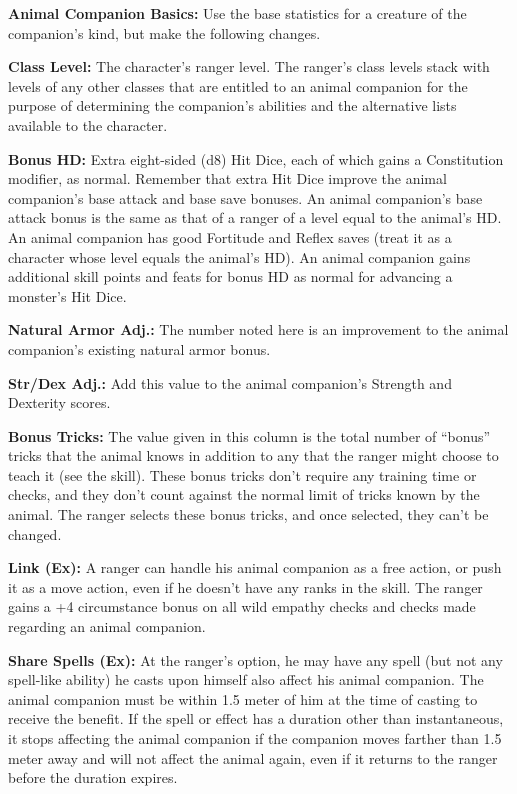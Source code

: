 
\textbf{Animal Companion Basics:} Use the base statistics for a creature of the companion's kind, but make the following changes.

\textbf{Class Level:} The character's ranger level. The ranger's class levels stack with levels of any other classes that are entitled to an animal companion for the purpose of determining the companion's abilities and the alternative lists available to the character.

\textbf{Bonus HD:} Extra eight-sided (d8) Hit Dice, each of which gains a Constitution modifier, as normal. Remember that extra Hit Dice improve the animal companion's base attack and base save bonuses. An animal companion's base attack bonus is the same as that of a ranger of a level equal to the animal's HD. An animal companion has good Fortitude and Reflex saves (treat it as a character whose level equals the animal's HD). An animal companion gains additional skill points and feats for bonus HD as normal for advancing a monster's Hit Dice.

\textbf{Natural Armor Adj.:} The number noted here is an improvement to the animal companion's existing natural armor bonus.

\textbf{Str/Dex Adj.:} Add this value to the animal companion's Strength and Dexterity scores.

\textbf{Bonus Tricks:} The value given in this column is the total number of ``bonus'' tricks that the animal knows in addition to any that the ranger might choose to teach it (see the  skill). These bonus tricks don't require any training time or  checks, and they don't count against the normal limit of tricks known by the animal. The ranger selects these bonus tricks, and once selected, they can't be changed.

\textbf{Link (Ex):} A ranger can handle his animal companion as a free action, or push it as a move action, even if he doesn't have any ranks in the  skill. The ranger gains a +4 circumstance bonus on all wild empathy checks and  checks made regarding an animal companion.

\textbf{Share Spells (Ex):} At the ranger's option, he may have any spell (but not any spell-like ability) he casts upon himself also affect his animal companion. The animal companion must be within 1.5 meter of him at the time of casting to receive the benefit. If the spell or effect has a duration other than instantaneous, it stops affecting the animal companion if the companion moves farther than 1.5 meter away and will not affect the animal again, even if it returns to the ranger before the duration expires.

